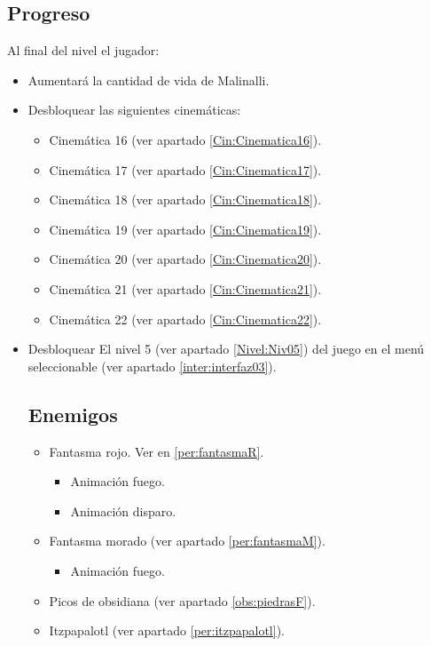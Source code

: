         \subsection{Progreso}
Al final del nivel el jugador:
\begin{itemize}
        \item Aumentará la cantidad de vida de Malinalli.
        \item Desbloquear las siguientes cinemáticas:
		\begin{itemize}
			\item Cinemática 16 (ver apartado \ref{Cin:Cinematica16}).
			\item Cinemática 17 (ver apartado \ref{Cin:Cinematica17}).
			\item Cinemática 18 (ver apartado \ref{Cin:Cinematica18}).
			\item Cinemática 19 (ver apartado \ref{Cin:Cinematica19}).
			\item Cinemática 20 (ver apartado \ref{Cin:Cinematica20}).
			\item Cinemática 21 (ver apartado \ref{Cin:Cinematica21}).
			\item Cinemática 22 (ver apartado \ref{Cin:Cinematica22}).
		\end{itemize}
        \item Desbloquear El nivel 5 (ver apartado \ref{Nivel:Niv05}) del juego en el menú seleccionable (ver apartado \ref{inter:interfaz03}).
        \subsection{Enemigos}
                \begin{itemize}
                        \item Fantasma rojo. Ver en \ref{per:fantasmaR}. 
            \begin{itemize}
				\item Animación fuego.
				\item Animación disparo.
			\end{itemize}
			\item Fantasma morado (ver apartado \ref{per:fantasmaM}).
			\begin{itemize}
				\item Animación fuego.
			\end{itemize}
            \item Picos de obsidiana (ver apartado \ref{obs:piedrasF}).
             \item Itzpapalotl (ver apartado \ref{per:itzpapalotl}).
                \end{itemize}

\end{itemize}
